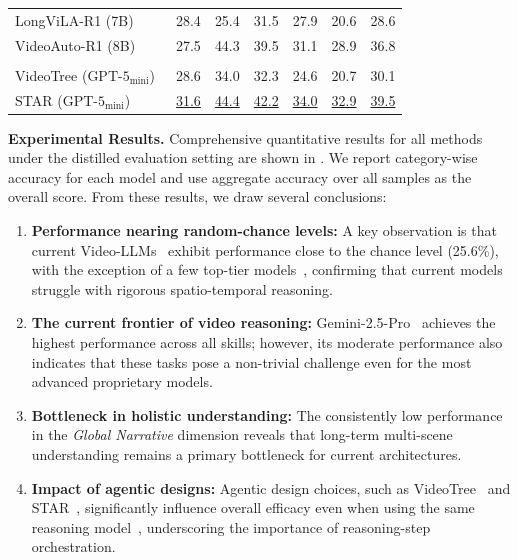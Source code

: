 \documentclass[runningheads]{llncs}
\begin{document}
{\begin{table}[ht]
{\begin{tabular}{l ccccc c}
                    LongViLA-R1 (7B)~\cite{longvilar1} & 28.4 & 25.4 & 31.5 & 27.9 & 20.6 & 28.6 \\
                    VideoAuto-R1 (8B)~\cite{videoautor1} & 27.5 & 44.3 & 39.5 & 31.1 & 28.9 & 36.8 \\
                    \midrule
                    \rowcolor[gray]{0.9} \multicolumn{7}{l}{\textit{Agentic Methods}} \\
                    VideoTree ($\text{GPT-5}_\text{{mini}}$)~\cite{videotree} & 28.6 & 34.0 & 32.3 & 24.6 & 20.7 & 30.1 \\
                    STAR ($\text{GPT-5}_\text{{mini}}$)~\cite{videotool} & \underline{31.6} & \underline{44.4} & \underline{42.2} & \underline{34.0} & \underline{32.9} & \underline{39.5} \\
                    \bottomrule
                \end{tabular}
            } \vspace{-4mm}
        \end{table}
                
        \noindent \textbf{Experimental Results.} 
        Comprehensive quantitative results for all methods under the distilled evaluation setting are shown in .
        We report category-wise accuracy for each model and use aggregate accuracy over all samples as the overall score.
        From these results, we draw several conclusions:
        \begin{enumerate}
            \item \textbf{Performance nearing random-chance levels:} A key observation is that current Video-LLMs~\cite{qwen25vl,videor1,longvilar1} exhibit performance close to the chance level (25.6\%), with the exception of a few top-tier models~\cite{videotool,gemini25}, confirming that current models struggle with rigorous spatio-temporal reasoning.
        
            \item \textbf{The current frontier of video reasoning:} Gemini-2.5-Pro~\cite{gemini25} achieves the highest performance across all skills; however, its moderate performance also indicates that these tasks pose a non-trivial challenge even for the most advanced proprietary models.
        
            \item \textbf{Bottleneck in holistic understanding:} The consistently low performance in the \textit{Global Narrative} dimension reveals that long-term multi-scene understanding remains a primary bottleneck for current architectures.
        
            \item \textbf{Impact of agentic designs:} Agentic design choices, such as VideoTree~\cite{videotree} and STAR~\cite{videotool}, significantly influence overall efficacy even when using the same reasoning model~\cite{gpt5}, underscoring the importance of reasoning-step orchestration.
                        
        \end{enumerate}

}
\end{document}
